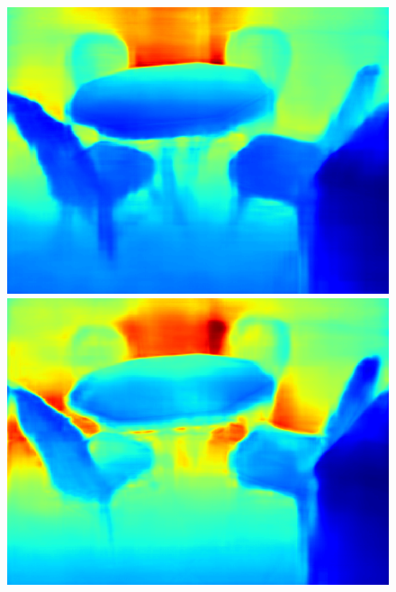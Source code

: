 \documentclass{svjour3}                     %
\begin{document}
\begin{figure}[t]
{\begin{minipage}[t]{0.15\linewidth}
  \includegraphics[width=1\linewidth]{images/nyu_result/kitchen_rgb_00760.png}
  \includegraphics[width=1\linewidth]{images/nyu_without/kitchen_rgb_00760.png}
  \end{minipage}%
  }
\end{figure}
\end{document}

